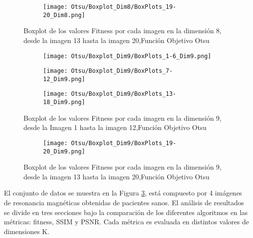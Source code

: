\documentclass[conference]{IEEEtran}
\begin{document}
\begin{figure}
    \centering
    \begin{subfigure}{0.5\textwidth}
        \texttt{[image: Otsu/Boxplot\_Dim8/BoxPlots\_19-20\_Dim8.png]}
        \vspace{-150pt} %
    \end{subfigure}
    \caption{Boxplot de los valores Fitness por cada imagen en la dimensión 8, desde la imagen 13 hasta la imagen 20,Función Objetivo Otsu}
    \label{fig:imagenes}    
\end{figure}
\begin{figure}
    \centering

    \begin{subfigure}{0.5\textwidth}
        \texttt{[image: Otsu/Boxplot\_Dim9/BoxPlots\_1-6\_Dim9.png]}
    \end{subfigure}
    
    \begin{subfigure}{0.5\textwidth}
        \texttt{[image: Otsu/Boxplot\_Dim9/BoxPlots\_7-12\_Dim9.png]}
    \end{subfigure}
         \begin{subfigure}{0.5\textwidth}
        \texttt{[image: Otsu/Boxplot\_Dim9/BoxPlots\_13-18\_Dim9.png]}
    \end{subfigure}
    \caption{Boxplot de los valores Fitness por cada imagen en la dimensión 9, desde la Imagen 1 hasta la imagen 12,Función Objetivo Otsu}
\label{fig:imagenes}    
\end{figure}

\begin{figure}
    \centering
    \begin{subfigure}{0.5\textwidth}
        \texttt{[image: Otsu/Boxplot\_Dim9/BoxPlots\_19-20\_Dim9.png]}
        \vspace{-150pt} %
    \end{subfigure}
    \caption{Boxplot de los valores Fitness por cada imagen en la dimensión 9, desde la imagen 13 hasta la imagen 20,Función Objetivo Otsu}
    \label{fig:imagenes}    
\end{figure}





\noindent El conjunto de datos se muestra en la Figura \ref{fig:imagenes}, está compuesto por 4 imágenes de resonancia magnéticas obtenidas de pacientes sanos. 
El análisis de resultados se divide en tres secciones bajo la comparación de los diferentes algoritmos en las métricas: fitness, SSIM y PSNR. Cada métrica es evaluada en distintos valores de dimensiones K.
\end{document}
